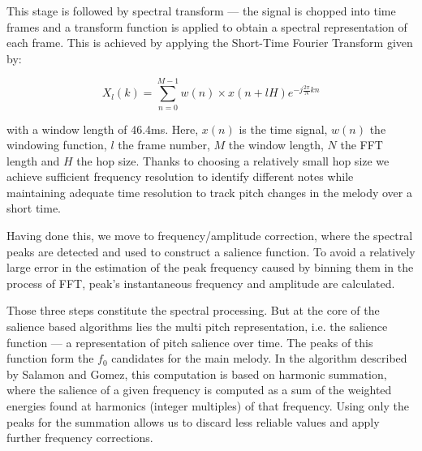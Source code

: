 This stage is followed by spectral transform — the signal is chopped into time frames and a transform function is applied to obtain a spectral representation of each frame.
This is achieved by applying the Short-Time Fourier Transform given by:

\begin{equation}
X_{l}(k) = \sum_{n=0}^{M-1} w(n) \times x(n + lH) e^{-j\frac{2 \pi}{N}kn}
\end{equation}

with a window length of 46.4ms. Here, $x(n)$ is the time signal, $w(n)$ the windowing function, $l$ the frame number, $M$ the window length, $N$ the FFT length and $H$ the hop size. Thanks to choosing a relatively small hop size we achieve sufficient frequency resolution to identify different notes while maintaining adequate time resolution to track pitch changes in the melody over a short time. 

Having done this, we move to frequency/amplitude correction, where the spectral peaks are detected and used to construct a salience function. To avoid a relatively large error in the estimation of the peak frequency caused by binning them in the process of FFT, peak’s instantaneous frequency and amplitude are calculated. 

Those three steps constitute the spectral processing. But at the core of the salience based algorithms lies the multi pitch representation, i.e. the salience function — a representation of pitch salience over time. The peaks of this function form the $f_{0}$ candidates for the main melody. In the algorithm described by Salamon and Gomez, this computation is based on harmonic summation, where the salience of  a given frequency is computed as a sum of the weighted energies found at harmonics (integer multiples) of that frequency. Using only the peaks for the summation allows us to discard less reliable values and apply further frequency corrections. 


